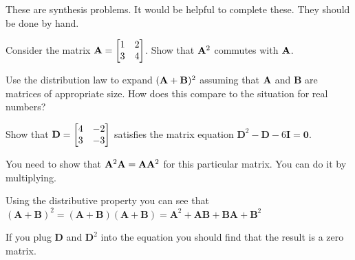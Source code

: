 \begin{prob}
These are synthesis problems. It would be helpful to complete these. They should be done by hand.
\be
\item Consider the matrix $\mathbf{A} = \begin{bmatrix} 1 & 2 \\ 3 & 4\end{bmatrix}$. Show that $\mathbf{A}^2$ commutes with $\mathbf{A}$. 
\item Use the distribution law to expand $(\mathbf{A} + \mathbf{B})^2$ assuming that $\mathbf{A}$ and $\mathbf{B}$ are matrices of appropriate size. How does this compare to the situation for real numbers?
\item Show that $\mathbf{D} = \begin{bmatrix} 4 & -2 \\ 3 & -3\end{bmatrix}$ satisfies the matrix equation $\mathbf{D}^2 - \mathbf{D} - 6 \mathbf{I} = \mathbf{0}$.
\ee
\end{prob}
\begin{sol}
\be
\item You need to show that $\mathbf{A}^2 \mathbf{A} = \mathbf{A} \mathbf{A}^2$ for this particular matrix. You can do it by multiplying.
\item Using the distributive property  you can see that $(\mathbf{A} + \mathbf{B})^2 = (\mathbf{A} + \mathbf{B}) ( \mathbf{A} + \mathbf{B}) = \mathbf{A}^2 + \mathbf{AB} + \mathbf{BA} + \mathbf{B}^2$
\item If you plug $\mathbf{D}$ and $\mathbf{D}^2$ into the equation you should find that the result is a zero matrix.
\ee
\end{sol}


